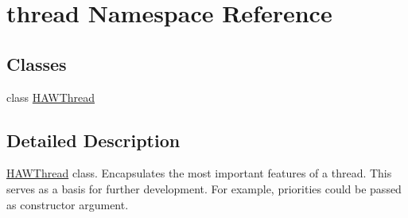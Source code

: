 \hypertarget{namespacethread}{\section{thread Namespace Reference}
\label{namespacethread}
}
\subsection*{Classes}
\begin{DoxyCompactItemize}
\item 
class \hyperlink{classthread_1_1HAWThread}{H\-A\-W\-Thread}
\end{DoxyCompactItemize}


\subsection{Detailed Description}
\hyperlink{classthread_1_1HAWThread}{H\-A\-W\-Thread} class. Encapsulates the most important features of a thread. This serves as a basis for further development. For example, priorities could be passed as constructor argument. 